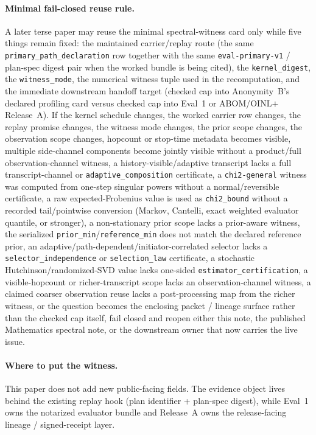 \documentclass[11pt]{article}
\begin{document}
\paragraph{Minimal fail-closed reuse rule.}
A later terse paper may reuse the minimal spectral-witness card only while five things remain fixed: the maintained carrier/replay route (the same \texttt{primary\_path\_declaration} row together with the same \texttt{eval-primary-v1} / plan-spec digest pair when the worked bundle is being cited), the \texttt{kernel\_digest}, the \texttt{witness\_mode}, the numerical witness tuple used in the recomputation, and the immediate downstream handoff target (checked cap into Anonymity~B's declared profiling card versus checked cap into Eval~1 or ABOM/OINL$+\,$Release~A). If the kernel schedule changes, the worked carrier row changes, the replay promise changes, the witness mode changes, the prior scope changes, the observation scope changes, hopcount or stop-time metadata becomes visible, multiple side-channel components become jointly visible without a product/full observation-channel witness, a history-visible/adaptive transcript lacks a full transcript-channel or \nolinkurl{adaptive_composition} certificate, a \texttt{chi2-general} witness was computed from one-step singular powers without a normal/reversible certificate, a raw expected-Frobenius value is used as \texttt{chi2\_bound} without a recorded tail/pointwise conversion (Markov, Cantelli, exact weighted evaluator quantile, or stronger), a non-stationary prior scope lacks a prior-aware witness, the serialized \texttt{prior\_min}/\texttt{reference\_min} does not match the declared reference prior, an adaptive/path-dependent/initiator-correlated selector lacks a \texttt{selector\_independence} or \texttt{selection\_law} certificate, a stochastic Hutchinson/randomized-SVD value lacks one-sided \nolinkurl{estimator_certification}, a visible-hopcount or richer-transcript scope lacks an observation-channel witness, a claimed coarser observation reuse lacks a post-processing map from the richer witness, or the question becomes the enclosing packet / lineage surface rather than the checked cap itself, fail closed and reopen either this note, the published Mathematics spectral note, or the downstream owner that now carries the live issue.\cite{series:spectral,series:workedexample,series:profiling,series:notcert,series:abomoinl,series:releaseA}

\paragraph{Where to put the witness.}
This paper does not add new public-facing fields.
The evidence object lives behind the existing replay hook (plan identifier + plan-spec digest), while Eval~1 owns the notarized evaluator bundle and Release~A owns the release-facing lineage / signed-receipt layer.\cite{series:auditorreplay,series:notcert,series:releaseA}
\end{document}
